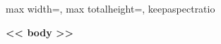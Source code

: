 \documentclass[10pt]{memoir}
\begin{document}
\noindent%
\begin{minipage}[c][\dimexpr\textheight-1pt\relax][c]{\textwidth}
  \centering
  \begin{adjustbox}{max width=\textwidth, max totalheight=\textheight, keepaspectratio}
    \begin{minipage}{\textwidth}
      \centering\Large\bfseries << body >>
    \end{minipage}
  \end{adjustbox}
\end{minipage}%
\end{document}

